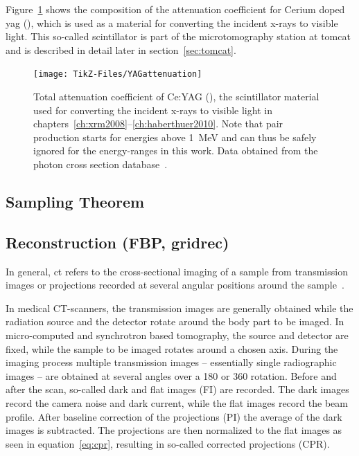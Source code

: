 Figure~\ref{fig:yag attenuation} shows the composition of the attenuation coefficient for Cerium doped \ac{yag} (), which is used as a material for converting the incident x-rays to visible light. This so-called scintillator is part of the microtomography station at \ac{tomcat} and is described in detail later in section~\ref{sec:tomcat}.

\begin{figure}[htb]
	\centering
	\texttt{[image: TikZ-Files/YAGattenuation]}
	\caption{Total attenuation coefficient of Ce:YAG (), the scintillator material used for converting the incident x-rays to visible light in chapters~\ref{ch:xrm2008}--\ref{ch:haberthuer2010}. Note that pair production starts for energies above \SI{1}{\mega\electronvolt} and can thus be safely ignored for the energy-ranges in this work. Data obtained from the photon cross section database~\cite{XCOM}.}
	\label{fig:yag attenuation}
\end{figure}

\subsection{Sampling Theorem}
\subsection{Reconstruction (FBP, gridrec)}

In general, \ac{ct} refers to the cross-sectional imaging of a sample from transmission images or projections recorded at several angular positions around the sample~\cite{Kak2002}.

In medical \ac{CT}-scanners, the transmission images are generally obtained while the radiation source and the detector rotate around the body part to be imaged. In micro-computed and synchrotron based tomography, the source and detector are fixed, while the sample to be imaged rotates around a chosen axis. During the imaging process multiple transmission images -- essentially single radiographic images -- are obtained at several angles over a \unit{180}{\degree} or \unit{360}{\degree} rotation. Before and after the scan, so-called dark and flat images (FI) are recorded. The dark images record the camera noise and dark current, while the flat images record the beam profile. After baseline correction of the projections (PI) the average of the dark images is subtracted. The projections are then normalized to the flat images as seen in equation~\ref{eq:cpr}, resulting in so-called corrected projections (CPR).

